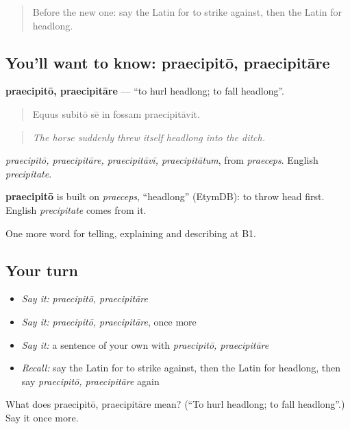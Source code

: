 \begin{quote}
Before the new one: say the Latin for to strike against, then the Latin for headlong.
\end{quote}

\subsection*{You'll want to know: praecipitō, praecipitāre}
\textbf{praecipitō, praecipitāre} — \textquotedblleft{}to hurl headlong; to fall headlong\textquotedblright{}.

\begin{quote}
Equus subitō sē in fossam praecipitāvit.
\end{quote}

\begin{quote}
\emph{The horse suddenly threw itself headlong into the ditch.}
\end{quote}

\emph{praecipitō, praecipitāre, praecipitāvī, praecipitātum}, from \emph{praeceps}. English \emph{precipitate}.

\begin{cousinweb}
\textbf{praecipitō} is built on \emph{praeceps}, \textquotedblleft{}headlong\textquotedblright{} (EtymDB): to throw head first. English \emph{precipitate} comes from it.
\end{cousinweb}

\begin{grammarlens}[title={What you've built}]
One more word for telling, explaining and describing at B1.
\end{grammarlens}

\subsection*{Your turn}
\begin{itemize}
\raggedright
  \item \emph{Say it:} \emph{praecipitō, praecipitāre}
  \item \emph{Say it:} \emph{praecipitō, praecipitāre}, once more
  \item \emph{Say it:} a sentence of your own with \emph{praecipitō, praecipitāre}
  \item \emph{Recall:} say the Latin for to strike against, then the Latin for headlong, then say \emph{praecipitō, praecipitāre} again
\end{itemize}

\begin{tcolorbox}[breakable,colback=teal!4,colframe=teal!35!black,title={Before you move on}]
What does praecipitō, praecipitāre mean? (\textquotedblleft{}To hurl headlong; to fall headlong\textquotedblright{}.) Say it once more.
\end{tcolorbox}
